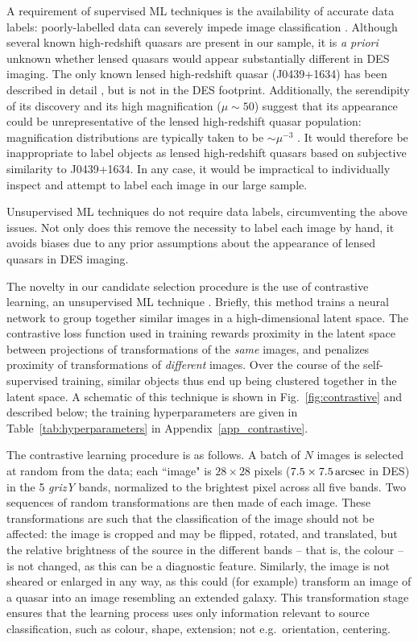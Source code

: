 \documentclass[fleqn,usenatbib]{mnras}
\begin{document}
A requirement of supervised ML techniques is the availability of accurate data labels: poorly-labelled data can severely impede image classification \citep{frenay14}.
Although several known high-redshift quasars are present in our sample, it is \textit{a priori} unknown whether lensed quasars would appear substantially different in DES imaging.
The only known lensed high-redshift quasar (J0439+1634) has been described in detail \citep{fan19}, but is not in the DES footprint.
Additionally, the serendipity of its discovery and its high magnification ($\mu\sim50$) suggest that its appearance could be unrepresentative of the lensed high-redshift quasar population:
magnification distributions are typically taken to be $\sim \mu^{-3}$ \citep{schneider92, wyithe11, minghao22}.
It would therefore be inappropriate to label objects as lensed high-redshift quasars based on subjective similarity to J0439+1634.
In any case, it would be impractical to individually inspect and attempt to label each image in our large sample.

Unsupervised ML techniques do not require data labels, circumventing the above issues.
Not only does this remove the necessity to label each image by hand, it avoids biases due to any prior assumptions about the appearance of lensed quasars in DES imaging.

The novelty in our candidate selection procedure is the use of contrastive learning, an unsupervised ML technique \citep{chen20}.
Briefly, this method trains a neural network to group together similar images in a high-dimensional latent space.
The contrastive loss function used in training rewards proximity in the latent space between projections of transformations of the \textit{same} images, and penalizes proximity of transformations of \textit{different} images.
Over the course of the self-supervised training, similar objects thus end up being clustered together in the latent space.
A schematic of this technique is shown in Fig.~\ref{fig:contrastive} and described below; the training hyperparameters are given in Table~\ref{tab:hyperparameters} in Appendix~\ref{app_contrastive}.

The contrastive learning procedure is as follows.
A batch of $N$ images is selected at random from the data; each ``image" is $28\times28$ pixels ($7.5\times7.5\arcsec$ in DES) in the 5 \textit{grizY} bands, normalized to the brightest pixel across all five bands.
Two sequences of random transformations are then made of each image.
These transformations are such that the classification of the image should not be affected: the image is cropped and may be flipped, rotated, and translated, but the relative brightness of the source in the different bands -- that is, the colour -- is not changed, as this can be a diagnostic feature.
Similarly, the image is not sheared or enlarged in any way, as this could (for example) transform an image of a quasar into an image resembling an extended galaxy.
This transformation stage ensures that the learning process uses only information relevant to source classification, such as colour, shape, extension; not e.g.\ orientation, centering.
\end{document}
